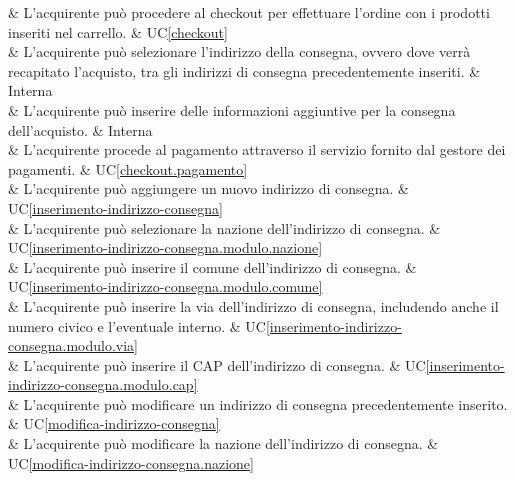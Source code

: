  & L'acquirente può procedere al checkout per effettuare l'ordine con i prodotti inseriti nel carrello. & UC\ref{checkout} \\

 & L'acquirente può selezionare l'indirizzo della consegna, ovvero dove verrà recapitato l'acquisto, tra gli indirizzi di consegna precedentemente inseriti. & Interna \\

 & L'acquirente può inserire delle informazioni aggiuntive per la consegna dell'acquisto. & Interna \\

 & L'acquirente procede al pagamento attraverso il servizio fornito dal gestore dei pagamenti. & UC\ref{checkout.pagamento} \\

 & L'acquirente può aggiungere un nuovo indirizzo di consegna. & UC\ref{inserimento-indirizzo-consegna} \\

 & L'acquirente può selezionare la nazione dell'indirizzo di consegna. & UC\ref{inserimento-indirizzo-consegna.modulo.nazione} \\

 & L'acquirente può inserire il comune dell'indirizzo di consegna. & UC\ref{inserimento-indirizzo-consegna.modulo.comune} \\

 & L'acquirente può inserire la via dell'indirizzo di consegna, includendo anche il numero civico e l'eventuale interno. & UC\ref{inserimento-indirizzo-consegna.modulo.via} \\

 & L'acquirente può inserire il CAP dell'indirizzo di consegna. & UC\ref{inserimento-indirizzo-consegna.modulo.cap} \\

 & L'acquirente può modificare un indirizzo di consegna precedentemente inserito. & UC\ref{modifica-indirizzo-consegna} \\

 & L'acquirente può modificare la nazione dell'indirizzo di consegna. & UC\ref{modifica-indirizzo-consegna.nazione} \\

